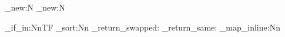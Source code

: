 
\usepackage{expl3}
\usepackage{etoolbox}
\usepackage[
style=ieee,
citestyle=authoryear,
maxnames=3
]{biblatex}


\ExplSyntaxOn

\clist_new:N \scncitenames
\prop_new:N \scncitelist

\NewDocumentCommand {} 
{
    \prop_if_in:NnTF 
}
\NewDocumentCommand \printscnbiblio {} 
{
    \clist_sort:Nn \scncitenames
    {
        { \sort_return_swapped: }
        { \sort_return_same: }
    }
    \clist_map_inline:Nn 
}
\ExplSyntaxOff

\newcommand{\scncite}[1]{
\scncitecommon{#1}{\cite{#1}}
}

\newcommand{\scncitecommon}[2]{
\hspace{-0.6em}\textit{#2}\hspace{-0.8em}
\addcite{#2}{\printscncite{#1}{#2}}
}

\newcommand{\printscncite}[2]{
\scnheader{#2}
\scntext{библиографическая ссылка}{\fullcite{#1}}
}

\newcommand{\scnciteannotation}[1]{
	\scntext{аннотация}{\citefield{#1}{annotation}}
}
